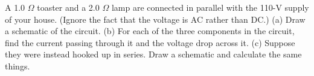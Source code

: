 A 1.0 $\Omega$ toaster and a 2.0 $\Omega$ lamp are connected in
        parallel with the 110-V supply of your house. (Ignore the
        fact that the voltage is AC rather than DC.) \hwendpart
        (a) Draw a
        schematic of the circuit.  \hwendpart
        (b)  For each of the three
        components in the circuit, find the current passing through
        it and the voltage drop across it. \answercheck\hwendpart
        (c) Suppose they were
        instead hooked up in series.  Draw a schematic and
        calculate the same things.\answercheck
